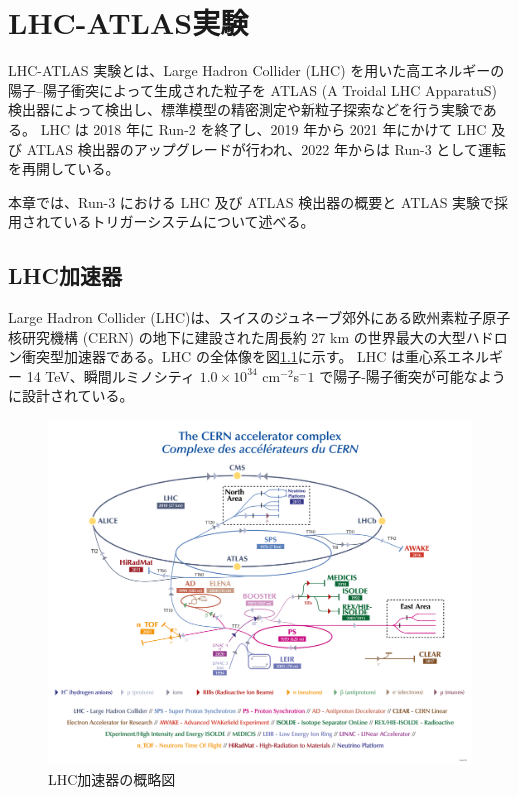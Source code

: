 \chapter{LHC-ATLAS実験}
\label{chapter2}

LHC-ATLAS 実験とは、Large Hadron Collider (LHC) を用いた高エネルギーの陽子–陽子衝突によって生成された粒子を ATLAS (A Troidal LHC ApparatuS) 検出器によって検出し、標準模型の精密測定や新粒子探索などを行う実験である。
LHC は 2018 年に Run-2 を終了し、2019 年から 2021 年にかけて LHC 及び ATLAS 検出器のアップグレードが行われ、2022 年からは Run-3 として運転を再開している。

本章では、Run-3 における LHC 及び ATLAS 検出器の概要と ATLAS 実験で採用されているトリガーシステムについて述べる。

\section{LHC加速器}
\label{section2-1}
Large Hadron Collider (LHC)は、スイスのジュネーブ郊外にある欧州素粒子原子核研究機構 (CERN) の地下に建設された周長約 27 km の世界最大の大型ハドロン衝突型加速器である。LHC の全体像を図\ref{fig:LHC加速器}に示す。
LHC は重心系エネルギー 14 TeV、瞬間ルミノシティ $1.0\times10^{34}$ cm$^{-2}$s${^-1}$ で陽子-陽子衝突が可能なように設計されている。

\begin{figure}[tb]
  \centering
  \includegraphics[clip]{fig/2/accel_complex-v2022_complex.png}
  \caption{LHC加速器の概略図}
  \label{fig:LHC加速器}
\end{figure}

